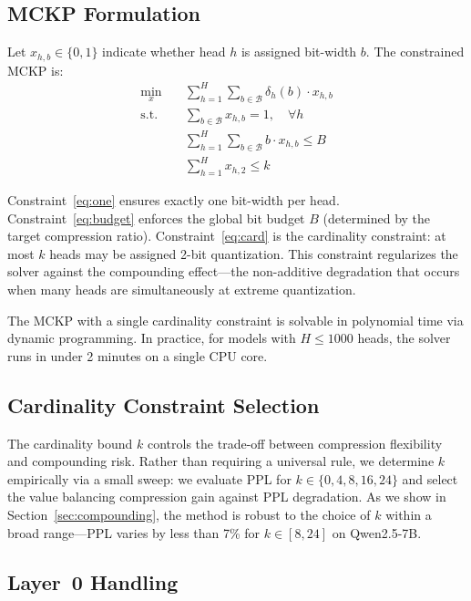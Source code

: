 \documentclass[11pt,a4paper]{article}
\begin{document}
\subsection{MCKP Formulation}

Let $x_{h,b} \in \{0, 1\}$ indicate whether head $h$ is assigned bit-width $b$.
The constrained MCKP is:
\begin{align}
\min_{x} \quad & \sum_{h=1}^{H} \sum_{b \in \mathcal{B}} \delta_h(b) \cdot x_{h,b} \label{eq:obj} \\
\text{s.t.} \quad & \sum_{b \in \mathcal{B}} x_{h,b} = 1, \quad \forall h \label{eq:one} \\
& \sum_{h=1}^{H} \sum_{b \in \mathcal{B}} b \cdot x_{h,b} \leq B \label{eq:budget} \\
& \sum_{h=1}^{H} x_{h,2} \leq k \label{eq:card}
\end{align}

Constraint~\eqref{eq:one} ensures exactly one bit-width per head.
Constraint~\eqref{eq:budget} enforces the global bit budget $B$ (determined by the target compression ratio).
Constraint~\eqref{eq:card} is the cardinality constraint: at most $k$ heads may be assigned 2-bit quantization.
This constraint regularizes the solver against the compounding effect---the non-additive degradation that occurs when many heads are simultaneously at extreme quantization.

The MCKP with a single cardinality constraint is solvable in polynomial time via dynamic programming.
In practice, for models with $H \leq 1000$ heads, the solver runs in under 2 minutes on a single CPU core.

\subsection{Cardinality Constraint Selection}

The cardinality bound $k$ controls the trade-off between compression flexibility and compounding risk.
Rather than requiring a universal rule, we determine $k$ empirically via a small sweep: we evaluate PPL for $k \in \{0, 4, 8, 16, 24\}$ and select the value balancing compression gain against PPL degradation.
As we show in Section~\ref{sec:compounding}, the method is robust to the choice of $k$ within a broad range---PPL varies by less than 7\% for $k \in [8, 24]$ on Qwen2.5-7B.

\subsection{Layer~0 Handling}
\end{document}
